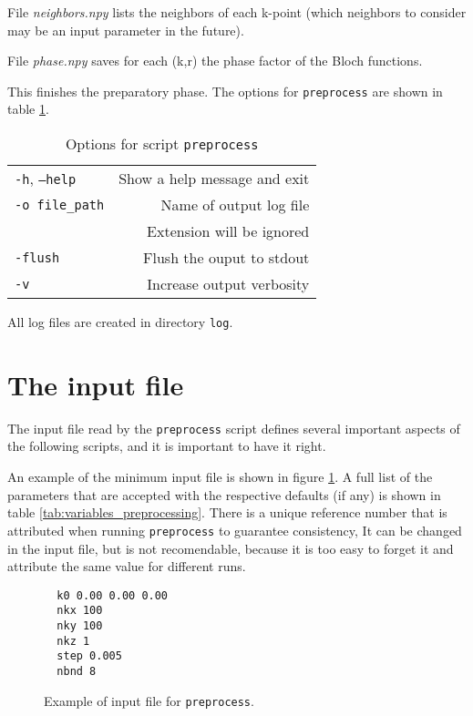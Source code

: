 \documentclass[a4paper,12pt]{report}
\begin{document}
File \emph{neighbors.npy} lists the neighbors of each k-point
(which neighbors to consider may be an input parameter in the future).

File \emph{phase.npy} saves for each (k,r) the phase factor of the Bloch functions.

This finishes the preparatory phase.
The options for \texttt{preprocess} are shown in table \ref{tab:options_preprocess}.

\begin{table}[h]
 \centering
 \caption{Options for script \texttt{preprocess}}\label{tab:options_preprocess}
\begin{tabular}[]{lr}
\hline
  \texttt{-h}, \texttt{--help}  &\hspace*{2cm} Show a help message and exit \\
  \texttt{-o file\_path}        & Name of output log file\\
                                & Extension will be ignored \\
  \texttt{-flush}               & Flush the ouput to stdout \\
  \texttt{-v}                   & Increase output verbosity \\
  \hline
\end{tabular}
\end{table}

All log files are created in directory \verb|log|.




 \section{The input file}

 The input file read by the \texttt{preprocess} script defines several important
 aspects of the following scripts, and it is important to have it right.

 An example of the minimum input file is shown in figure \ref{code:inputfile}.
 A full list of the parameters that are accepted with the respective defaults (if any)
 is shown in table \ref{tab:variables_preprocessing}.
 There is a unique reference number that is attributed when running \texttt{preprocess} to guarantee consistency,
 It can be changed in the input file, but is not recomendable,
 because it is too easy to forget it
 and attribute the same value for different runs.

\begin{figure}[h]
 \centering
\begin{verbatim}
  k0 0.00 0.00 0.00
  nkx 100
  nky 100
  nkz 1
  step 0.005
  nbnd 8
\end{verbatim}
\caption{Example of input file for \texttt{preprocess}.}
\label{code:inputfile}
\end{figure}
\end{document}
